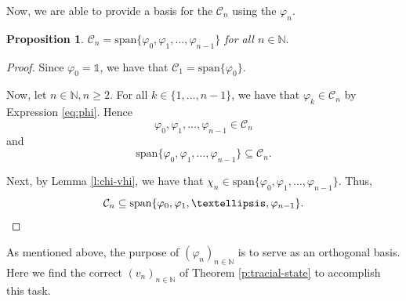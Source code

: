 \documentclass[]{amsart}
\newcommand{\ninn}{n \in \N}
\newcommand{\vhi}{{\varphi}}
\newcommand{\N}{{\mathds{N}}}
\newcommand{\cc}{{\mathcal{C}}}
\theoremstyle{plain}
\newtheorem{proposition}[theorem]{Proposition}
\theoremstyle{definition}
\theoremstyle{remark}
\renewcommand{\geq}{\geqslant}
\numberwithin{equation}{section}
\begin{document}
Now, we are able to provide a basis for the $\cc_n$ using the $\vhi_n$. 
\begin{proposition}\label{p:vhi-span}
$\cc_n=\mathrm{span}\{\vhi_0, \vhi_1, \ldots, \vhi_{n-1}\}$
for all $\ninn.$
\end{proposition}
\begin{proof} 
Since $\vhi_0=\mathds{1}$, we have that $\cc_1=\mathrm{span}\{\vhi_0\}.$

Now, let $\ninn, n \geq 2.$ For all $k\in \{1, \ldots, n-1\}$, we have that $\vhi_k \in \cc_n$ by Expression \eqref{eq:phi}. Hence
\[
 \vhi_0, \vhi_1, \ldots, \vhi_{n-1} \in  \cc_n
\]
and 
\[
\mathrm{span} \{ \vhi_0, \vhi_1, \ldots, \vhi_{n-1}  \} \subseteq \cc_n.
\]

 
 Next, by Lemma \ref{l:chi-vhi}, we have that $\chi_n \in \mathrm{span}\{\vhi_0, \vhi_1, \ldots, \vhi_{n-1}\}$. Thus, \[\cc_n \subseteq \mathrm{span}\{\vhi_0, \vhi_1, \ldots, \vhi_{n-1}\}.\qedhere\]
\end{proof}


                 As mentioned above, the purpose of $(\vhi_n)_{n \in \N}$ is to serve as an orthogonal basis. Here we find the correct $(v_n)_{n \in \N}$ of Theorem \ref{p:tracial-state} to accomplish this task.
                 
\end{document}
